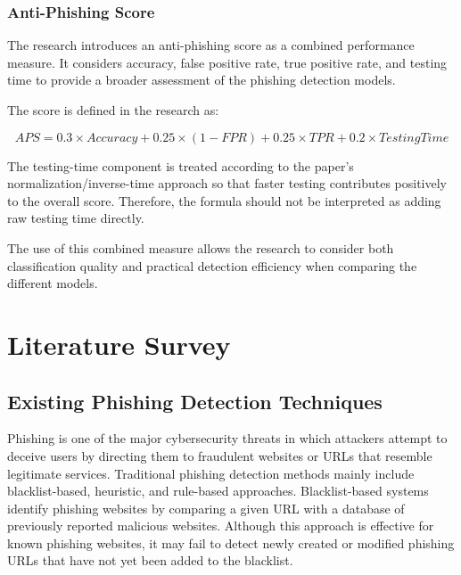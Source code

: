\documentclass[12pt,a4paper]{report}
\begin{document}
\subsection{Anti-Phishing Score}

The research introduces an anti-phishing score as a combined
performance measure. It considers accuracy, false positive rate,
true positive rate, and testing time to provide a broader assessment
of the phishing detection models.

The score is defined in the research as:

\begin{equation}
APS =
0.3 \times Accuracy
+ 0.25 \times (1-FPR)
+ 0.25 \times TPR
+ 0.2 \times TestingTime
\end{equation}

The testing-time component is treated according to the paper's
normalization/inverse-time approach so that faster testing
contributes positively to the overall score. Therefore, the formula
should not be interpreted as adding raw testing time directly.

The use of this combined measure allows the research to consider
both classification quality and practical detection efficiency when
comparing the different models.


\chapter{Literature Survey}

\section{Existing Phishing Detection Techniques}

Phishing is one of the major cybersecurity threats in which attackers attempt to deceive users by directing them to fraudulent websites or URLs that resemble legitimate services. Traditional phishing detection methods mainly include blacklist-based, heuristic, and rule-based approaches. Blacklist-based systems identify phishing websites by comparing a given URL with a database of previously reported malicious websites. Although this approach is effective for known phishing websites, it may fail to detect newly created or modified phishing URLs that have not yet been added to the blacklist.
\end{document}
